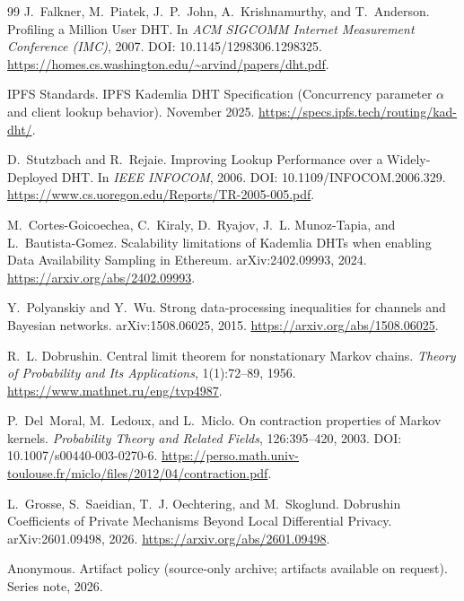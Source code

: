 \documentclass[11pt]{article}
\theoremstyle{definition}
\theoremstyle{remark}
\begin{document}
\begin{thebibliography}{99}
J.~Falkner, M.~Piatek, J.~P.~John, A.~Krishnamurthy, and T.~Anderson.
\newblock Profiling a Million User DHT.
\newblock In \emph{ACM SIGCOMM Internet Measurement Conference (IMC)}, 2007.
\newblock DOI: 10.1145/1298306.1298325.
\newblock \url{https://homes.cs.washington.edu/~arvind/papers/dht.pdf}.

IPFS Standards.
\newblock IPFS Kademlia DHT Specification (Concurrency parameter \(\alpha\) and client lookup behavior).
 November 2025.
\newblock \url{https://specs.ipfs.tech/routing/kad-dht/}.

D.~Stutzbach and R.~Rejaie.
\newblock Improving Lookup Performance over a Widely-Deployed DHT.
\newblock In \emph{IEEE INFOCOM}, 2006.
\newblock DOI: 10.1109/INFOCOM.2006.329.
\newblock \url{https://www.cs.uoregon.edu/Reports/TR-2005-005.pdf}.

M.~Cortes-Goicoechea, C.~Kiraly, D.~Ryajov, J.~L. Munoz-Tapia, and L.~Bautista-Gomez.
\newblock Scalability limitations of Kademlia DHTs when enabling Data Availability Sampling in Ethereum.
\newblock arXiv:2402.09993, 2024.
\newblock \url{https://arxiv.org/abs/2402.09993}.

Y.~Polyanskiy and Y.~Wu.
\newblock Strong data-processing inequalities for channels and Bayesian networks.
\newblock arXiv:1508.06025, 2015.
\newblock \url{https://arxiv.org/abs/1508.06025}.

R.~L. Dobrushin.
\newblock Central limit theorem for nonstationary Markov chains.
\newblock \emph{Theory of Probability and Its Applications}, 1(1):72--89, 1956.
\newblock \url{https://www.mathnet.ru/eng/tvp4987}.

P.~Del~Moral, M.~Ledoux, and L.~Miclo.
\newblock On contraction properties of Markov kernels.
\newblock \emph{Probability Theory and Related Fields}, 126:395--420, 2003.
\newblock DOI: 10.1007/s00440-003-0270-6. \url{https://perso.math.univ-toulouse.fr/miclo/files/2012/04/contraction.pdf}.

L.~Grosse, S.~Saeidian, T.~J. Oechtering, and M.~Skoglund.
\newblock Dobrushin Coefficients of Private Mechanisms Beyond Local Differential Privacy.
\newblock arXiv:2601.09498, 2026.
\newblock \url{https://arxiv.org/abs/2601.09498}.


Anonymous.
\newblock Artifact policy (source-only archive; artifacts available on request).
\newblock Series note, 2026.
\end{thebibliography}
\end{document}
